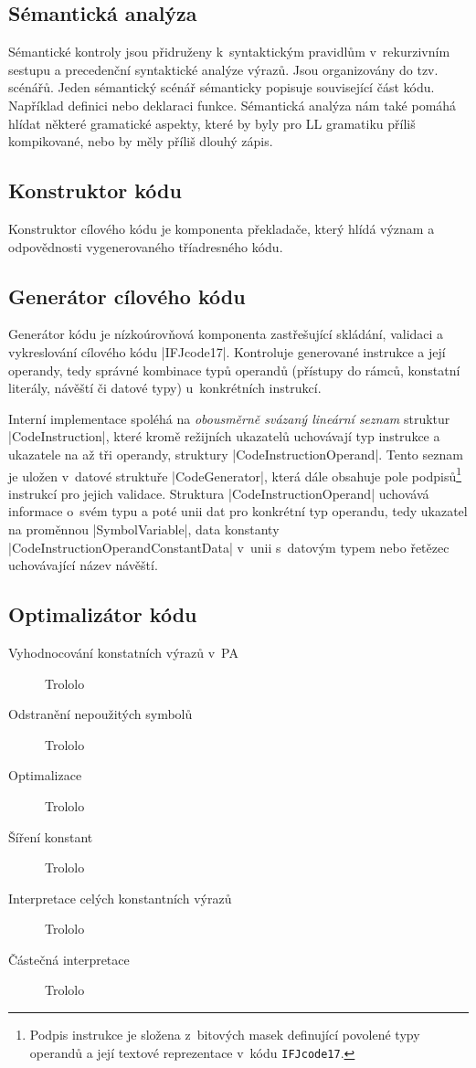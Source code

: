 \subsection{Sémantická analýza}
Sémantické kontroly jsou přidruženy k~syntaktickým pravidlům v~rekurzivním sestupu a
precedenční syntaktické analýze výrazů. Jsou organizovány do tzv. scénářů. Jeden
sémantický scénář sémanticky popisuje související část kódu. Například definici
nebo deklaraci funkce. Sémantická analýza nám také pomáhá hlídat některé gramatické aspekty,
které by byly pro LL gramatiku příliš kompikované, nebo by měly příliš dlouhý zápis.


\subsection{Konstruktor kódu}
\label{subsec:code-constructor}
Konstruktor cílového kódu je komponenta překladače, který hlídá význam a odpovědnosti vygenerovaného tříadresného kódu.

\subsection{Generátor cílového kódu}
Generátor kódu je nízkoúrovňová komponenta zastřešující skládání, validaci a vykreslování cílového kódu \ic|IFJcode17|.
Kontroluje generované instrukce a její operandy, tedy správné kombinace typů operandů (přístupy do rámců, konstatní
literály, návěští či datové typy) u~konkrétních instrukcí.

Interní implementace spoléhá na \emph{obousměrně svázaný lineární seznam} struktur \ic|CodeInstruction|, které kromě
režijních ukazatelů uchovávají typ instrukce a ukazatele na až tři operandy, struktury \ic|CodeInstructionOperand|.
Tento seznam je uložen v~datové struktuře \ic|CodeGenerator|, která dále obsahuje pole podpisů\footnote{Podpis
instrukce je složena z~bitových masek definující povolené typy operandů a její textové reprezentace v~kódu
\texttt{IFJcode17}.} instrukcí pro jejich validace.
Struktura \ic|CodeInstructionOperand| uchovává informace o~svém typu a poté unii dat pro konkrétní typ operandu, tedy
ukazatel na proměnnou \ic|SymbolVariable|,
data konstanty \ic|CodeInstructionOperandConstantData| v~unii s~datovým typem nebo řetězec uchovávající název návěští.

\subsection{Optimalizátor kódu}
\begin{description}
    \item[Vyhodnocování konstatních výrazů v~PA] Trololo
    \item[Odstranění nepoužitých symbolů] Trololo
    \item[Optimalizace ] Trololo
    \item[Šíření konstant] Trololo
    \item[Interpretace celých konstantních výrazů] Trololo
    \item[Částečná interpretace] Trololo
\end{description}

